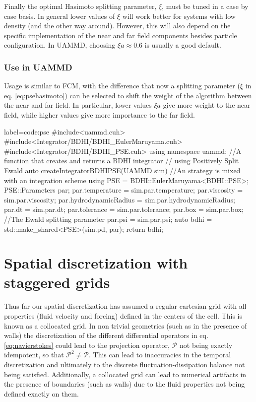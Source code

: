 \documentclass[ twoside,openright,titlepage,numbers=noenddot,%
headinclude,footinclude,cleardoublepage=empty,abstract=on,
BCOR=5mm,paper=a4,fontsize=11pt, dvipsnames
]{scrreprt}
\newcommand{\oper}[1]{\mathcal{#1}}
\newcommand{\uammd}{\gls{UAMMD}\xspace}
\begin{document}
Finally the optimal Hasimoto splitting parameter, $\xi$, must be tuned in a case by case basis. In general lower values of $\xi$ will work better for systems with low density (and the other way around). However, this will also depend on the specific implementation of the near and far field components besides particle configuration. In \uammd, choosing $\xi a \approx 0.6$ is usually a good default.

\subsubsection*{Use in UAMMD}

Usage is similar to \gls{FCM}, with the difference that now a splitting parameter ($\xi$ in eq. \eqref{eq:psehasimoto}) can be selected to shift the weight of the algorithm between the near and far field. In particular, lower values $\xi a$ give more weight to the near field, while higher values give more importance to the far field.

\begin{code2}  {label=code:pse}
#include<uammd.cuh>
#include<Integrator/BDHI/BDHI_EulerMaruyama.cuh>
#include<Integrator/BDHI/BDHI_PSE.cuh>
using namespace uammd;
//A function that creates and returns a BDHI integrator
// using Positively Split Ewald
auto createIntegratorBDHIPSE(UAMMD sim){   
  //An strategy is mixed with an integration scheme
  using PSE = BDHI::EulerMaruyama<BDHI::PSE>;
  PSE::Parameters par;
  par.temperature = sim.par.temperature;
  par.viscosity = sim.par.viscosity;
  par.hydrodynamicRadius = sim.par.hydrodynamicRadius;
  par.dt = sim.par.dt;
  par.tolerance = sim.par.tolerance;
  par.box = sim.par.box;
  //The Ewald splitting parameter
  par.psi = sim.par.psi;
  auto bdhi = std::make_shared<PSE>(sim.pd, par);
  return bdhi;
}
\end{code2}

\newpage
\section{Spatial discretization with staggered grids}\label{sec:staggered}

Thus far our spatial discretization has assumed a regular cartesian grid with all properties (fluid velocity and forcing) defined in the centers of the cell. This is known as a collocated grid. In non trivial geometries (such as in the presence of walls) the discretization of the different differential operators in eq. \eqref{eq:navierstokes} could lead to the projection operator, $\oper{P}$ not being exactly idempotent, so that $\oper{P}^2 \ne \oper{P}$. This can lead to inaccuracies in the temporal discretization and ultimately to the discrete fluctuation-dissipation balance not being satisfied. Additionally, a collocated grid can lead to numerical artifacts in the presence of boundaries (such as walls) due to the fluid properties not being defined exactly on them.
\end{document}
